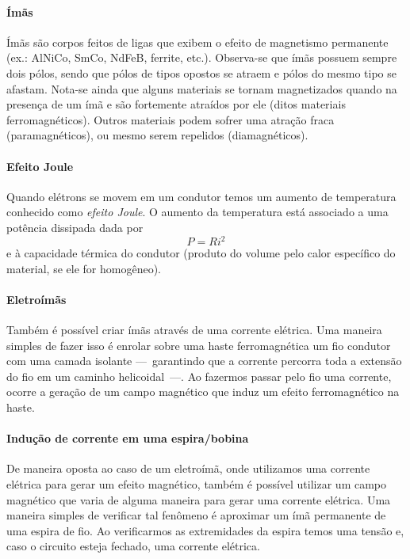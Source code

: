 \paragraph{Ímãs}

Ímãs são corpos feitos de ligas que exibem o efeito de magnetismo permanente (ex.: AlNiCo, SmCo, NdFeB, ferrite, etc.). Observa-se que ímãs possuem sempre dois pólos, sendo que pólos de tipos opostos se atraem e pólos do mesmo tipo se afastam. Nota-se ainda que alguns materiais se tornam magnetizados quando na presença de um ímã e são fortemente atraídos por ele (ditos materiais ferromagnéticos). Outros materiais podem sofrer uma atração fraca (paramagnéticos), ou mesmo serem repelidos (diamagnéticos).

\paragraph{Efeito Joule}

Quando elétrons se movem em um condutor temos um aumento de temperatura conhecido como \emph{efeito Joule}. O aumento da temperatura está associado a uma potência dissipada dada por 
\begin{equation}
    P = R i^2
\end{equation}
%
e à capacidade térmica do condutor (produto do volume pelo calor específico do material, se ele for homogêneo).

\paragraph{Eletroímãs}

Também é possível criar ímãs através de uma corrente elétrica. Uma maneira simples de fazer isso é  enrolar sobre uma haste ferromagnética um fio condutor com uma camada isolante ---~garantindo que a corrente percorra toda a extensão do fio em um caminho helicoidal~---. Ao fazermos passar pelo fio uma corrente, ocorre a geração de um campo magnético que induz um efeito ferromagnético na haste.

\paragraph{Indução de corrente em uma espira/bobina}

De maneira oposta ao caso de um eletroímã, onde utilizamos uma corrente elétrica para gerar um efeito magnético, também é possível utilizar um campo magnético que varia de alguma maneira para gerar uma corrente elétrica. Uma maneira simples de verificar tal fenômeno é aproximar um ímã permanente de uma espira de fio. Ao verificarmos as extremidades da espira temos uma tensão e, caso o circuito esteja fechado, uma corrente elétrica.

